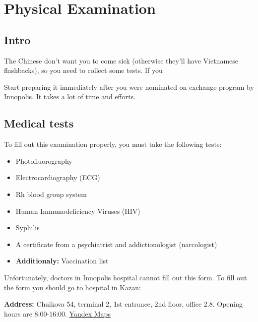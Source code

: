 
\chapter{Physical Examination}\label{ch:ru_medical_examination}

\section{Intro}\label{sec:ru_}


The Chinese don't want you to come sick
(otherwise they'll have Vietnamese flashbacks),
so you need to collect some tests.
If you


\begin{note}
    Start preparing it immediately after
    you were nominated on exchange program by Innopolis.
    It takes a lot of time and efforts.
\end{note}



\section{Medical tests}\label{sec:ru_medical_tests}

To fill out this examination properly,
you must take the following tests:
\begin{itemize}
    \item Photofluorography
    \item Electrocardiography (ECG)
    \item Rh blood group system
    \item Human Immunodeficiency Viruses (HIV)
    \item Syphilis
    \item A certificate from a psychiatrist and addictionologist (narcologist)
    \item \textbf{Additionaly:} Vaccination list
\end{itemize}


Unfortunately, doctors in Innopolis hospital cannot fill out this form.
To fill out the form you should go to hospital in Kazan:

\textbf{Address:} Chuikova 54, terminal 2, 1st entrance,
2nd floor, office 2.8. Opening hours are 8:00-16:00.
\href{https://yandex.ru/maps/-/CHeHe8KC}{Yandex Maps}











